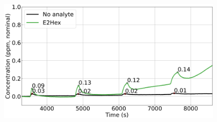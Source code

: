 \documentclass[
  a4paper,
]{scrbook}
\begin{document}
\begin{figure}
\begin{minipage}[t]{0.70\linewidth}
{{\includegraphics{figures/ch9/input_time_comparison_E2Hex.png}

}

}

\end{minipage}%
%
\begin{minipage}[t]{0.15\linewidth}

{\centering 

~

}

\end{minipage}%
\newline
\begin{minipage}[t]{0.11\linewidth}

{\centering 

~

}

\end{minipage}%
%
\begin{minipage}[t]{0.03\linewidth}

{\centering 


}

\end{minipage}%
%
\begin{minipage}[t]{0.01\linewidth}

{\centering 

~

}


\end{minipage}
\end{figure}
\end{document}
